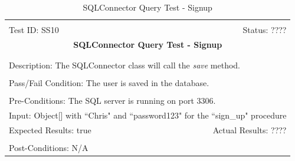 \documentclass[11pt]{article}
\begin{document}
\begin{center}
\begin{table}[H]
\begin{tabular}{|l r|}\hline&\\[-2mm]
	Test ID: SS10	&Status: ????\\[-3mm]
	\multicolumn{2}{|c|}{\textbf{\large{SQLConnector Query Test - Signup}}}\\&\\\hline&\\[-3mm]
	\multicolumn{2}{|p{\textwidth}|}{Description: The SQLConnector class will call the \textit{save} method.}\\[1mm]\hline&\\[-3mm]
	\multicolumn{2}{|p{\textwidth}|}{Pass/Fail Condition: The user is saved in the database.}\\[1mm]\hline&\\[-3mm]
	\multicolumn{2}{|p{\textwidth}|}{Pre-Conditions: The SQL server is running on port 3306.}\\[4mm]
	\multicolumn{2}{|p{\textwidth}|}{Input: Object[] with ``Chris" and ``password123" for the ``sign\_up" procedure}\\[2mm]\hline
	\multicolumn{1}{|p{0.49\textwidth}}{Expected Results: true}	&\multicolumn{1}{|p{0.45\textwidth}|}{Actual Results: ????}\\\hline&\\[-3mm]
	\multicolumn{2}{|p{\textwidth}|}{Post-Conditions: N/A}\\\hline
\end{tabular}
\caption{SQLConnector Query Test - Signup}
\end{table}
\end{center}
\end{document}
